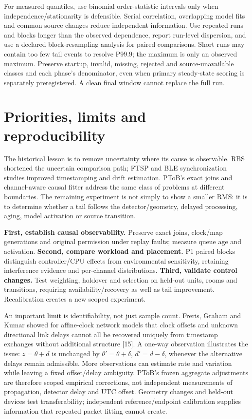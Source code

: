 \documentclass[11pt,letterpaper]{article}
\begin{document}
For measured quantiles, use binomial order-statistic intervals only when independence/stationarity is defensible. Serial correlation, overlapping model fits and common source changes reduce independent information. Use repeated runs and blocks longer than the observed dependence, report run-level dispersion, and use a declared block-resampling analysis for paired comparisons. Short runs may contain too few tail events to resolve P99.9; the maximum is only an observed maximum. Preserve startup, invalid, missing, rejected and source-unavailable classes and each phase's denominator, even when primary steady-state scoring is separately preregistered. A clean final window cannot replace the full run.
\newpage
\section{Priorities, limits and reproducibility}
The historical lesson is to remove uncertainty where its cause is observable. RBS shortened the uncertain comparison path; FTSP and BLE synchronization studies improved timestamping and drift estimation. PToB's exact joins and channel-aware causal fitter address the same class of problems at different boundaries. The remaining experiment is not simply to show a smaller RMS: it is to determine whether a tail follows the detector/geometry, delayed processing, aging, model activation or source transition.

\textbf{First, establish causal observability.} Preserve exact joins, clock/map generations and original permission under replay faults; measure queue age and activation. \textbf{Second, compare workload and placement.} P1 paired blocks distinguish controller/CPU effects from environmental sensitivity, retaining interference evidence and per-channel distributions. \textbf{Third, validate control changes.} Test weighting, holdover and selection on held-out units, rooms and transitions, requiring availability/recovery as well as tail improvement. Recalibration creates a new scoped experiment.

An important limit is identifiability, not just sample count. Freris, Graham and Kumar showed for affine-clock network models that clock offsets and unknown directional link delays cannot all be recovered uniquely from timestamp exchanges without additional structure [15]. A one-way observation illustrates the issue: $z=\theta+d$ is unchanged by $\theta'=\theta+\delta$, $d'=d-\delta$, whenever the alternative delays remain admissible. More observations can estimate rate and variation while leaving a fixed offset/delay ambiguity. PToB's frozen aggregate adjustments are therefore scoped empirical corrections, not independent measurements of propagation, detector delay and UTC offset. Geometry changes and held-out devices test transferability; independent reference/endpoint calibration supplies information that repeated packet fitting cannot create.
\end{document}
